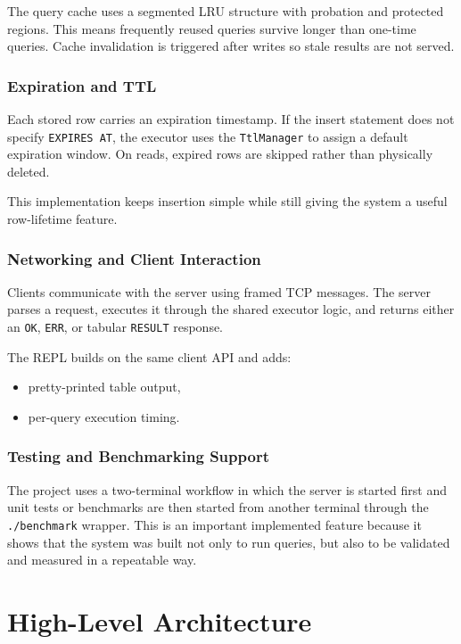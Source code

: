 \documentclass[12pt,a4paper]{article}
\begin{document}
The query cache uses a segmented LRU structure with probation and protected
regions. This means frequently reused queries survive longer than one-time
queries. Cache invalidation is triggered after writes so stale results are not
served.

\subsubsection{Expiration and TTL}

Each stored row carries an expiration timestamp. If the insert statement does
not specify \texttt{EXPIRES AT}, the executor uses the \texttt{TtlManager} to
assign a default expiration window. On reads, expired rows are skipped rather
than physically deleted.

This implementation keeps insertion simple while still giving the system a
useful row-lifetime feature.

\subsubsection{Networking and Client Interaction}

Clients communicate with the server using framed TCP messages. The server
parses a request, executes it through the shared executor logic, and returns
either an \texttt{OK}, \texttt{ERR}, or tabular \texttt{RESULT} response.

The REPL builds on the same client API and adds:

\begin{itemize}[leftmargin=1.8em]
  \item pretty-printed table output,
  \item per-query execution timing.
\end{itemize}

\subsubsection{Testing and Benchmarking Support}

The project uses a two-terminal workflow in which the server is started first
and unit tests or benchmarks are then started from another terminal through the
\texttt{./benchmark} wrapper. This is an important implemented feature because
it shows that the system was built not only to run queries, but also to be
validated and measured in a repeatable way.

\section{High-Level Architecture}
\end{document}
